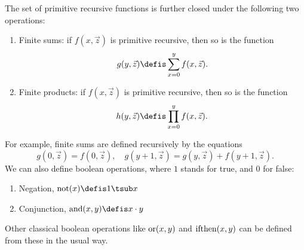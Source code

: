 \documentclass[../../include/open-logic-section]{subfiles}
\begin{document}
The set of primitive recursive functions is further closed under the
following two operations:
\begin{enumerate}
\item Finite sums: if $f(x,\vec z)$ is primitive recursive, then so is the
function 
\[
g(y,\vec z) \defis \sum_{x = 0}^y f(x,\vec z).
\]
\item Finite products: if $f(x,\vec z)$ is primitive recursive, then so is the
function 
\[
h(y,\vec z) \defis \prod_{x = 0}^y f(x,\vec z).
\]
\end{enumerate}
For example, finite sums are defined recursively by the equations
\[
g(0,\vec z) = f(0,\vec z), \quad g(y+1,\vec z) = g(y,\vec z) +
f(y+1,\vec z).
\]
We can also define boolean operations, where $1$ stands for true, and
$0$ for false:
\begin{enumerate}
\item Negation, $\fn{not}(x) \defis 1 \tsub x$
\item Conjunction, $\fn{and}(x,y) \defis x \cdot y$
\end{enumerate}
Other classical boolean operations like $\mathrm{or}(x,y)$ and
$\mathrm{ifthen}(x,y)$ can be defined from these in the usual way.
\end{document}
